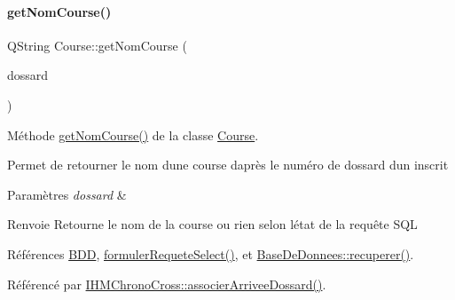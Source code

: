 \paragraph{\texorpdfstring{get\+Nom\+Course()}{getNomCourse()}}
{\footnotesize\ttfamily Q\+String Course\+::get\+Nom\+Course (\begin{DoxyParamCaption}\item[{Q\+String}]{dossard }\end{DoxyParamCaption})}



Méthode \hyperlink{class_course_a7b4485a0b38bc3b908131962b705d880}{get\+Nom\+Course()} de la classe \hyperlink{class_course}{Course}. 

Permet de retourner le nom d\textquotesingle{}une course d\textquotesingle{}après le numéro de dossard d\textquotesingle{}un inscrit 
\begin{DoxyParams}{Paramètres}
{\em dossard} & \\
\hline
\end{DoxyParams}
\begin{DoxyReturn}{Renvoie}
Retourne le nom de la course ou rien selon l\textquotesingle{}état de la requête S\+QL 
\end{DoxyReturn}


Références \hyperlink{class_course_a28a58b06494361b7a7eb81844d571dd4}{B\+DD}, \hyperlink{class_course_a2ce9c62ead2c878a30af9d9c11b81644}{formuler\+Requete\+Select()}, et \hyperlink{class_base_de_donnees_a77539baad389f5acf754cd2cd452403e}{Base\+De\+Donnees\+::recuperer()}.



Référencé par \hyperlink{class_i_h_m_chrono_cross_a9f7f1ad130b60300a879694b6234f161}{I\+H\+M\+Chrono\+Cross\+::associer\+Arrivee\+Dossard()}.


